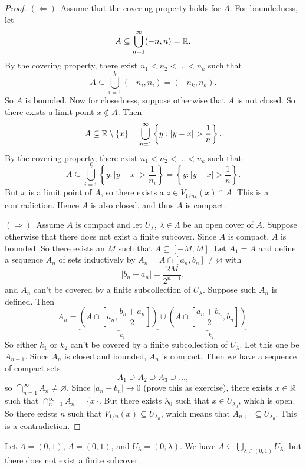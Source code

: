\begin{proof}
  $(\Leftarrow)$\, Assume that the covering property holds for
  $A$. For boundedness, let
  \[A \subseteq \bigcup_{n = 1}^\infty (-n, n) = \mathbb{R}.\]
  By the covering property, there exist
  $n_1 < n_2 < \dots < n_k$ such that
  \[A \subseteq \bigcup_{i = 1}^k (-n_i, n_i) = (-n_k, n_k).\]
  So $A$ is bounded. Now for closedness, suppose otherwise
  that $A$ is not closed. So there exists a limit point
  $x \notin A$. Then
  \[A \subseteq \mathbb{R} \setminus \{x\} = \bigcup_{n = 1}^\infty \left\{y : |y - x| > \frac{1}{n}\right\}.\]
  By the covering property, there exist
  $n_1 < n_2 < \dots < n_k$ such that
  \[A \subseteq \bigcup_{i = 1}^k \left\{y : |y - x| > \frac{1}{n_i}\right\} = \left\{y : |y - x| > \frac{1}{n}\right\}.\]
  But $x$ is a limit point of $A$, so there exists a
  $z \in V_{1 / n_k}(x) \cap A$. This is a contradiction.
  Hence $A$ is also closed, and thus $A$ is compact.

  $(\Rightarrow)$\, Assume $A$ is compact and let
  $U_\lambda$, $\lambda \in \Lambda$ be an open cover
  of $A$. Suppose otherwise that there does not
  exist a finite subcover.
  Since $A$ is compact, $A$ is bounded. So there exists
  an $M$ such that $A \subseteq [-M, M]$. Let $A_1 = A$
  and define a sequence $A_n$ of sets inductively by
  $A_n = A \cap [a_n, b_n] \ne \varnothing$ with
  \[
    |b_n - a_n| = \frac{2M}{2^{n - 1}}
  ,\]
  and $A_n$ can't be covered by a finite subcollection
  of $U_\lambda$. Suppose such $A_n$ is defined.
  Then
  \[A_n = \underbrace{\left(A \cap \left[a_n, \frac{b_n + a_n}{2}\right]\right)}_{= k_1} \cup \underbrace{\left(A \cap \left[\frac{a_n + b_n}{2}, b_n\right]\right)}_{= k_2}.\]
  So either $k_1$ or $k_2$ can't be covered by a finite
  subcollection of $U_\lambda$. Let this one be $A_{n + 1}$.
  Since $A_n$ is closed and bounded, $A_n$ is compact.
  Then we have a sequence of compact sets
  \[A_1 \supseteq A_2 \supseteq A_3 \supseteq \dots,\]
  so $\bigcap_{n = 1}^\infty A_n \ne \varnothing$.
  Since $|a_n - b_n| \to 0$ (prove this as exercise),
  there exists $x \in \mathbb{R}$ such that
  $\cap_{n = 1}^\infty A_n = \{x\}$. But there exists
  $\lambda_0$ such that $x \in U_{\lambda_0}$, which is open.
  So there exists $n$ such that
  $V_{1 / n}(x) \subseteq U_{\lambda_0}$, which means that
  $A_{n + 1} \subseteq U_{\lambda_0}$. This is a
  contradiction.
\end{proof}

\begin{example}
  Let $A = (0, 1)$, $\Lambda = (0, 1)$, and
  $U_\lambda = (0, \lambda)$. We have
  $A \subseteq \bigcup_{\lambda \in (0, 1)} U_\lambda$,
  but there does not exist a finite subcover.
\end{example}
